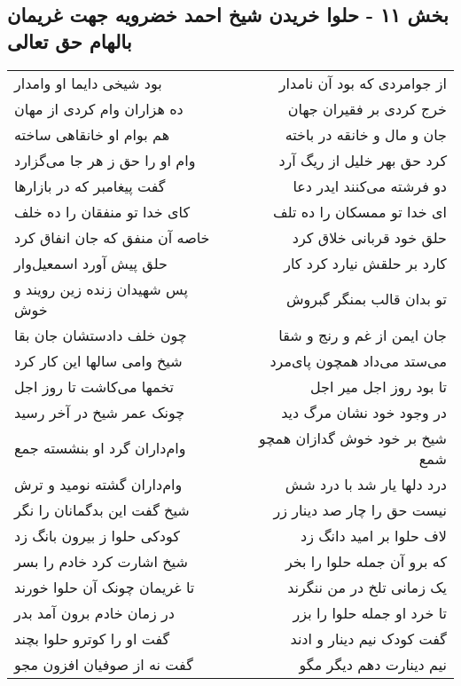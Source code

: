 \begin{center}
\section*{بخش ۱۱ - حلوا خریدن شیخ احمد خضرویه جهت غریمان بالهام حق تعالی}
\label{sec:sh011}
\begin{longtable}{l p{0.5cm} r}
بود شیخی دایما او وامدار
&&
از جوامردی که بود آن نامدار
\\
ده هزاران وام کردی از مهان
&&
خرج کردی بر فقیران جهان
\\
هم بوام او خانقاهی ساخته
&&
جان و مال و خانقه در باخته
\\
وام او را حق ز هر جا می‌گزارد
&&
کرد حق بهر خلیل از ریگ آرد
\\
گفت پیغامبر که در بازارها
&&
دو فرشته می‌کنند ایدر دعا
\\
کای خدا تو منفقان را ده خلف
&&
ای خدا تو ممسکان را ده تلف
\\
خاصه آن منفق که جان انفاق کرد
&&
حلق خود قربانی خلاق کرد
\\
حلق پیش آورد اسمعیل‌وار
&&
کارد بر حلقش نیارد کرد کار
\\
پس شهیدان زنده زین رویند و خوش
&&
تو بدان قالب بمنگر گبروش
\\
چون خلف دادستشان جان بقا
&&
جان ایمن از غم و رنج و شقا
\\
شیخ وامی سالها این کار کرد
&&
می‌ستد می‌داد همچون پای‌مرد
\\
تخمها می‌کاشت تا روز اجل
&&
تا بود روز اجل میر اجل
\\
چونک عمر شیخ در آخر رسید
&&
در وجود خود نشان مرگ دید
\\
وام‌داران گرد او بنشسته جمع
&&
شیخ بر خود خوش گدازان همچو شمع
\\
وام‌داران گشته نومید و ترش
&&
درد دلها یار شد با درد شش
\\
شیخ گفت این بدگمانان را نگر
&&
نیست حق را چار صد دینار زر
\\
کودکی حلوا ز بیرون بانگ زد
&&
لاف حلوا بر امید دانگ زد
\\
شیخ اشارت کرد خادم را بسر
&&
که برو آن جمله حلوا را بخر
\\
تا غریمان چونک آن حلوا خورند
&&
یک زمانی تلخ در من ننگرند
\\
در زمان خادم برون آمد بدر
&&
تا خرد او جمله حلوا را بزر
\\
گفت او را کوترو حلوا بچند
&&
گفت کودک نیم دینار و ادند
\\
گفت نه از صوفیان افزون مجو
&&
نیم دینارت دهم دیگر مگو
\\

\end{longtable}
\end{center}

